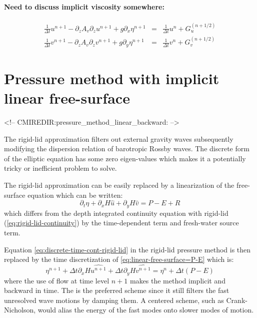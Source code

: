 \paragraph{Need to discuss implicit viscosity somewhere:}
\begin{eqnarray}
\frac{1}{\Delta t} u^{n+1} - \partial_z A_v \partial_z u^{n+1}
+ g \partial_x \eta^{n+1} & = & \frac{1}{\Delta t} u^{n} +
G_u^{(n+1/2)}
\\
\frac{1}{\Delta t} v^{n+1} - \partial_z A_v \partial_z v^{n+1}
+ g \partial_y \eta^{n+1} & = & \frac{1}{\Delta t} v^{n} + G_v^{(n+1/2)}
\end{eqnarray}


\section{Pressure method with implicit linear free-surface}
\label{sect:pressure-method-linear-backward}
\begin{rawhtml}
<!-- CMIREDIR:pressure_method_linear_backward: -->
\end{rawhtml}

The rigid-lid approximation filters out external gravity waves
subsequently modifying the dispersion relation of barotropic Rossby
waves. The discrete form of the elliptic equation has some zero
eigen-values which makes it a potentially tricky or inefficient
problem to solve.

The rigid-lid approximation can be easily replaced by a linearization
of the free-surface equation which can be written:
\begin{equation}
\partial_t \eta + \partial_x H \widehat{u} + \partial_y H \widehat{v} = P-E+R
\label{eq:linear-free-surface=P-E}
\end{equation}
which differs from the depth integrated continuity equation with
rigid-lid (\ref{eq:rigid-lid-continuity}) by the time-dependent term
and fresh-water source term.

Equation \ref{eq:discrete-time-cont-rigid-lid} in the rigid-lid
pressure method is then replaced by the time discretization of
\ref{eq:linear-free-surface=P-E} which is:
\begin{equation}
\eta^{n+1}
+ \Delta t \partial_x H \widehat{u^{n+1}}
+ \Delta t \partial_y H \widehat{v^{n+1}}
=
\eta^{n}
+ \Delta t ( P - E )
\label{eq:discrete-time-backward-free-surface}
\end{equation}
where the use of flow at time level $n+1$ makes the method implicit
and backward in time. The is the preferred scheme since it still
filters the fast unresolved wave motions by damping them. A centered
scheme, such as Crank-Nicholson, would alias the energy of the fast
modes onto slower modes of motion.

